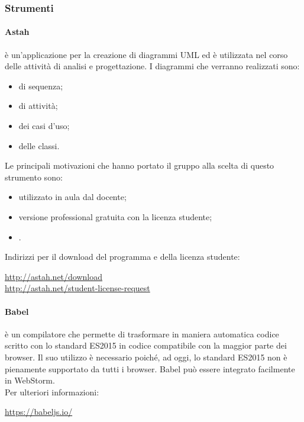 				\subsubsection{Strumenti}
				\paragraph{Astah} \label{sec:astah}
				 è un'applicazione per la creazione di diagrammi UML ed è utilizzata nel corso delle attività di analisi e progettazione. I diagrammi che verranno realizzati sono:
				\begin{itemize}
					\item di sequenza;
					\item di attività;
					\item dei casi d'uso;
					\item delle classi.
				\end{itemize}
				Le principali motivazioni che hanno portato il gruppo alla scelta di questo strumento sono:
				\begin{itemize}
					\item utilizzato in aula dal docente;
					\item versione professional gratuita con la licenza studente;
					\item {}.
				\end{itemize}
				Indirizzi per il download del programma e della licenza studente:
				\begin{center}
					\url{http://astah.net/download} \\
					\url{http://astah.net/student-license-request}
				\end{center}
				\paragraph{Babel} \label{sec:Babel}
				 è un compilatore \js{} che permette di trasformare in maniera automatica codice scritto con lo standard ES2015 in codice compatibile con la maggior parte dei browser. Il suo utilizzo è necessario poiché, ad oggi, lo standard ES2015 non è pienamente supportato da tutti i browser. Babel può essere integrato facilmente in WebStorm.\\
				Per ulteriori informazioni:
				\begin{center}
					\url{https://babeljs.io/}
				\end{center}
